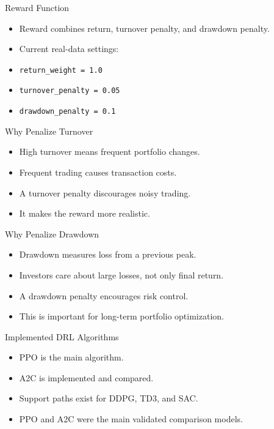 \documentclass[aspectratio=43,10pt]{beamer}
\begin{document}
\begin{frame}{Reward Function}
\begin{itemize}
  \item Reward combines return, turnover penalty, and drawdown penalty.
  \item Current real-data settings:
  \item \texttt{return\_weight = 1.0}
  \item \texttt{turnover\_penalty = 0.05}
  \item \texttt{drawdown\_penalty = 0.1}
\end{itemize}
\end{frame}

\begin{frame}{Why Penalize Turnover}
\begin{itemize}
  \item High turnover means frequent portfolio changes.
  \item Frequent trading causes transaction costs.
  \item A turnover penalty discourages noisy trading.
  \item It makes the reward more realistic.
\end{itemize}
\end{frame}

\begin{frame}{Why Penalize Drawdown}
\begin{itemize}
  \item Drawdown measures loss from a previous peak.
  \item Investors care about large losses, not only final return.
  \item A drawdown penalty encourages risk control.
  \item This is important for long-term portfolio optimization.
\end{itemize}
\end{frame}

\begin{frame}{Implemented DRL Algorithms}
\begin{itemize}
  \item PPO is the main algorithm.
  \item A2C is implemented and compared.
  \item Support paths exist for DDPG, TD3, and SAC.
  \item PPO and A2C were the main validated comparison models.
\end{itemize}
\end{frame}
\end{document}
